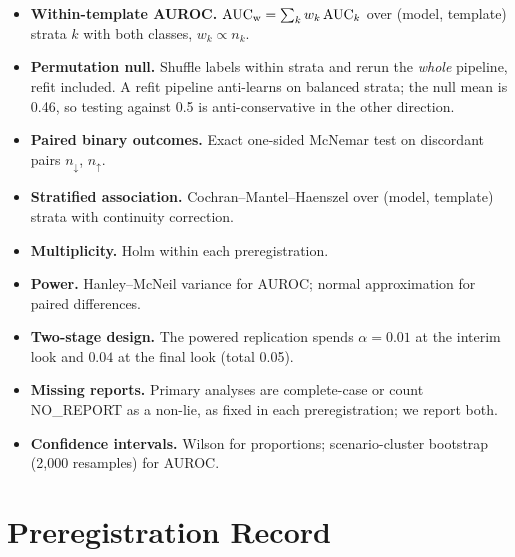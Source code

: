 \begin{itemize}
\item \textbf{Within-template AUROC.} $\mathrm{AUC}_{\mathrm{w}}=\sum_k w_k\,\mathrm{AUC}_k$ over (model, template) strata $k$ with both classes, $w_k\propto n_k$.
\item \textbf{Permutation null.} Shuffle labels within strata and rerun the \emph{whole} pipeline, refit included. A refit pipeline anti-learns on balanced strata; the null mean is 0.46, so testing against 0.5 is anti-conservative in the other direction.
\item \textbf{Paired binary outcomes.} Exact one-sided McNemar test on discordant pairs $n_\downarrow$, $n_\uparrow$.
\item \textbf{Stratified association.} Cochran--Mantel--Haenszel over (model, template) strata with continuity correction.
\item \textbf{Multiplicity.} Holm \citep{holm1979} within each preregistration.
\item \textbf{Power.} Hanley--McNeil variance \citep{hanley1982auc} for AUROC; normal approximation for paired differences.
\item \textbf{Two-stage design.} The powered replication spends $\alpha=0.01$ at the interim look and $0.04$ at the final look (total 0.05).
\item \textbf{Missing reports.} Primary analyses are complete-case or count NO\_REPORT as a non-lie, as fixed in each preregistration; we report both.
\item \textbf{Confidence intervals.} Wilson for proportions; scenario-cluster bootstrap (2{,}000 resamples) for AUROC.
\end{itemize}

\section{Preregistration Record}
\label{app:prereg}

